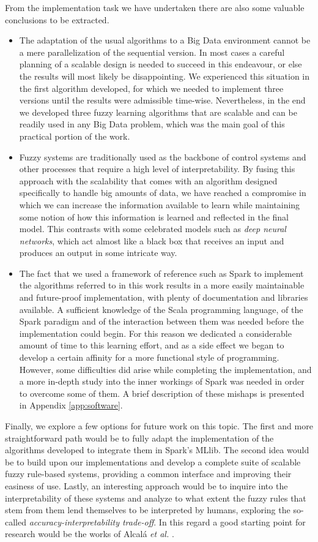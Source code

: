From the implementation task we have undertaken there are also some valuable conclusions to be extracted.

\begin{itemize}
  \item The adaptation of the usual algorithms to a Big Data environment cannot be a mere parallelization of the sequential version. In most cases a careful planning of a scalable design is needed to succeed in this endeavour, or else the results will most likely be disappointing. We experienced this situation in the first algorithm developed, for which we needed to implement three versions until the results were admissible time-wise. Nevertheless, in the end we developed three fuzzy learning algorithms that are scalable and can be readily used in any Big Data problem, which was the main goal of this practical portion of the work.
  \item Fuzzy systems are traditionally used as the backbone of control systems and other processes that require a high level of interpretability. By fusing this approach with the scalability that comes with an algorithm designed specifically to handle big amounts of data, we have reached a compromise in which we can increase the information available to learn while maintaining some notion of how this information is learned and reflected in the final model. This contrasts with some celebrated models such as \textit{deep neural networks}, which act almost like a black box that receives an input and produces an output in some intricate way.
  \item The fact that we used a framework of reference such as Spark to implement the algorithms referred to in this work results in a more easily maintainable and future-proof implementation, with plenty of documentation and libraries available. A sufficient knowledge of the Scala programming language, of the Spark paradigm and of the interaction between them was needed before the implementation could begin. For this reason we dedicated a considerable amount of time to this learning effort, and as a side effect we began to develop a certain affinity for a more functional style of programming. However, some difficulties did arise while completing the implementation, and a more in-depth study into the inner workings of Spark was needed in order to overcome some of them. A brief description of these mishaps is presented in Appendix \ref{app:software}.
\end{itemize}

Finally, we explore a few options for future work on this topic. The first and more straightforward path would be to fully adapt the implementation of the algorithms developed to integrate them in Spark's MLlib. The second idea would be to build upon our implementations and develop a complete suite of scalable fuzzy rule-based systems, providing a common interface and improving their easiness of use. Lastly, an interesting approach would be to inquire into the interpretability of these systems and analyze to what extent the fuzzy rules that stem from them lend themselves to be interpreted by humans, exploring the so-called \textit{accuracy-interpretability trade-off}. In this regard a good starting point for research would be the works of Alcalá \textit{et al.} \cite{hybrid2006alcala,gacto2011interpretability}.
